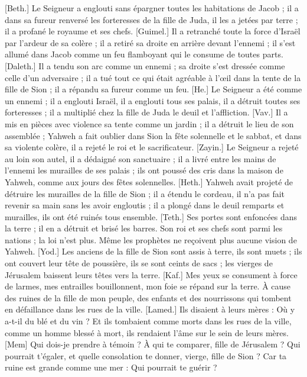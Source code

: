 \begin{multicols}{2}
[Beth.] Le Seigneur a englouti sans épargner toutes les habitations de Jacob ; il a dans sa fureur renversé les forteresses de la fille de Juda, il les a jetées par terre ; il a profané le royaume et ses chefs.
[Guimel.] Il a retranché toute la force d'Israël par l'ardeur de sa colère ; il a retiré sa droite en arrière devant l'ennemi ; il s'est allumé dans Jacob comme un feu flamboyant qui le consume de toutes parts.
[Daleth.] Il a tendu son arc comme un ennemi ; sa droite s'est dressée comme celle d'un adversaire ; il a tué tout ce qui était agréable à l'œil dans la tente de la fille de Sion ; il a répandu sa fureur comme un feu.
[He.] Le Seigneur a été comme un ennemi ; il a englouti Israël, il a englouti tous ses palais, il a détruit toutes ses forteresses ; il a multiplié chez la fille de Juda le deuil et l'affliction.
[Vav.] Il a mis en pièces avec violence sa tente comme un jardin ; il a détruit le lieu de son assemblée ; Yahweh a fait oublier dans Sion la fête solennelle et le sabbat, et dans sa violente colère, il a rejeté le roi et le sacrificateur.
[Zayin.] Le Seigneur a rejeté au loin son autel, il a dédaigné son sanctuaire ; il a livré entre les mains de l'ennemi les murailles de ses palais ; ils ont poussé des cris dans la maison de Yahweh, comme aux jours des fêtes solennelles.
[Heth.] Yahweh avait projeté de détruire les murailles de la fille de Sion ; il a étendu le cordeau, il n'a pas fait revenir sa main sans les avoir engloutis ; il a plongé dans le deuil remparts et murailles, ils ont été ruinés tous ensemble.
[Teth.] Ses portes sont enfoncées dans la terre ; il en a détruit et brisé les barres. Son roi et ses chefs sont parmi les nations ; la loi n'est plus. Même les prophètes ne reçoivent plus aucune vision de Yahweh.
[Yod.] Les anciens de la fille de Sion sont assis à terre, ils sont muets ; ils ont couvert leur tête de poussière, ils se sont ceints de sacs ; les vierges de Jérusalem baissent leurs têtes vers la terre.
[Kaf.] Mes yeux se consument à force de larmes, mes entrailles bouillonnent, mon foie se répand sur la terre. À cause des ruines de la fille de mon peuple, des enfants et des nourrissons qui tombent en défaillance dans les rues de la ville.
[Lamed.] Ils disaient à leurs mères : Où y a-t-il du blé et du vin ? Et ils tombaient comme morts dans les rues de la ville, comme un homme blessé à mort, ils rendaient l'âme sur le sein de leurs mères.
[Mem] Qui dois-je prendre à témoin ? À qui te comparer, fille de Jérusalem ? Qui pourrait t'égaler, et quelle consolation te donner, vierge, fille de Sion ? Car ta ruine est grande comme une mer : Qui pourrait te guérir ?

\end{multicols}
